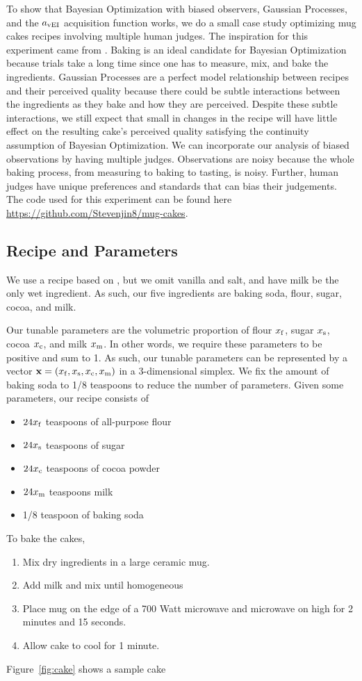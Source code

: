 To show that Bayesian Optimization with biased observers, Gaussian Processes, and the $a_{\vei}$ acquisition function works,
we do a small case study optimizing mug cakes recipes involving multiple human judges.
The inspiration for this experiment came from \cite{Solnik2017}.
Baking is an ideal candidate for Bayesian Optimization because
trials take a long time since one has to measure, mix, and bake the ingredients.
Gaussian Processes are a perfect model relationship between recipes and their perceived quality because there could be subtle interactions between the ingredients as they bake and how they are perceived.
Despite these subtle interactions, we still expect that small in changes in the recipe will have little effect on the resulting cake's perceived quality satisfying the continuity assumption of Bayesian Optimization.
We can incorporate our analysis of biased observations by having multiple judges.
Observations are noisy because the whole baking process, from measuring to baking to tasting, is noisy.
Further, human judges have unique preferences and standards that can bias their judgements.
The code used for this experiment can be found here \url{https://github.com/Stevenjin8/mug-cakes}.

\subsection{Recipe and Parameters}\label{ssec:recip}

We use a recipe based on \cite{mugcake}, but we omit vanilla and salt, and have milk be the only wet ingredient.
As such, our five ingredients are baking soda, flour, sugar, cocoa, and milk.

Our tunable parameters are the volumetric proportion of flour $x_\ff$, sugar $x_\ss$, cocoa $x_\cc$, and milk $x_\mm$.
In other words, we require these parameters to be positive and sum to 1.
As such, our tunable parameters can be represented by a vector $\mathbf{x} = (x_\ff, x_\ss, x_\cc,x_\mm)$ in a 3-dimensional simplex.
We fix the amount of baking soda to 1/8 teaspoons to reduce the number of parameters.
Given some parameters, our recipe consists of
\begin{itemize}
    \item $24x_\ff$ teaspoons of all-purpose flour
    \item $24x_\ss$ teaspoons of sugar
    \item $24x_\cc$ teaspoons of cocoa powder
    \item $24x_\mm$ teaspoons milk
    \item 1/8 teaspoon of baking soda
\end{itemize}
To bake the cakes,
\begin{enumerate}
    \item Mix dry ingredients in a large ceramic mug.
    \item Add milk and mix until homogeneous
    \item Place mug on the edge of a 700 Watt microwave and microwave on high for 2 minutes and 15 seconds.
    \item Allow cake to cool for 1 minute.
\end{enumerate}
Figure~\ref{fig:cake} shows a sample cake

